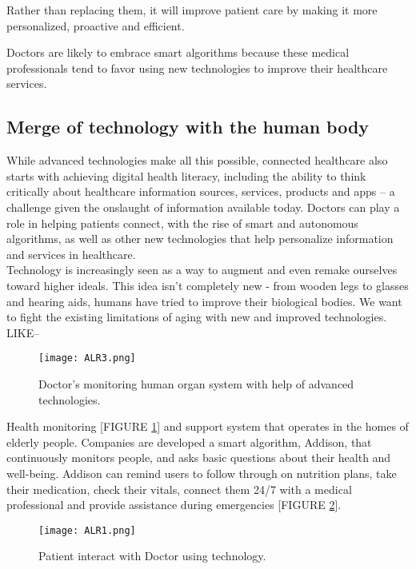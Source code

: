 \documentclass[12pt]{article}
\begin{document}
Rather than replacing them, it will improve patient care by making it more personalized, proactive and efficient.

Doctors are likely to embrace smart algorithms because these medical professionals tend to favor using new technologies to improve their healthcare services.
\clearpage
\subsection{Merge of technology with the human body}
While advanced technologies make all this possible, connected 
healthcare also starts with achieving digital health literacy, 
including the ability to think critically about healthcare 
information sources, services, products and apps – a challenge 
given the onslaught of information available today. Doctors can 
play a role in helping patients connect, with the rise of smart and 
autonomous algorithms, as well as other new technologies that 
help personalize information and services in healthcare.\\

\> Technology is increasingly seen as a way to augment and even remake ourselves toward higher ideals.
This idea isn't completely new - from wooden legs to glasses and hearing aids, humans have tried to improve their biological bodies.
We want to fight the existing limitations of aging with new and improved technologies.\\
LIKE--
\begin{figure}[h]
\centering
\texttt{[image: ALR3.png]}
\caption{Doctor's monitoring  human organ system with help of advanced technologies.}
\label{fig_ALR3}
\end{figure}

 Health monitoring [FIGURE \ref{fig_ALR3}]  and support system that 
operates in the homes of elderly people. Companies are
developed a smart algorithm, Addison, that continuously monitors 
people, and asks basic questions about their health and well-being. 
Addison can remind users to follow through on nutrition plans, 
take their medication, check their vitals, connect them 24/7 with a 
medical professional and provide assistance during emergencies [FIGURE \ref{fig_ALR1}].
\begin{figure}[h]
\centering
\texttt{[image: ALR1.png]}
\caption{Patient interact with Doctor using technology.}
\label{fig_ALR1}
\end{figure}\\ 
\end{document}

